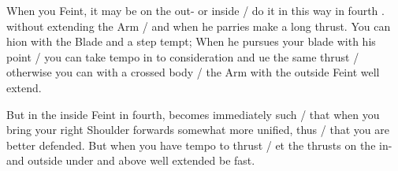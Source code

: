 When you Feint, it may be on the out- or inside / do it in this way in
fourth . without extending the Arm / and when he parries make a long
thrust. You can hion with the Blade and a step tempt; When he pursues
your blade with his point / you can take tempo in to consideration and
ue the same thrust / otherwise you can with a crossed body / the Arm
with the outside Feint well extend.


But in the inside Feint in fourth, becomes immediately such / that
when you bring your right Shoulder forwards somewhat more unified,
thus / that you are better  defended. But when you have tempo to thrust / et the
thrusts on the in- and outside under and above well extended be fast.


